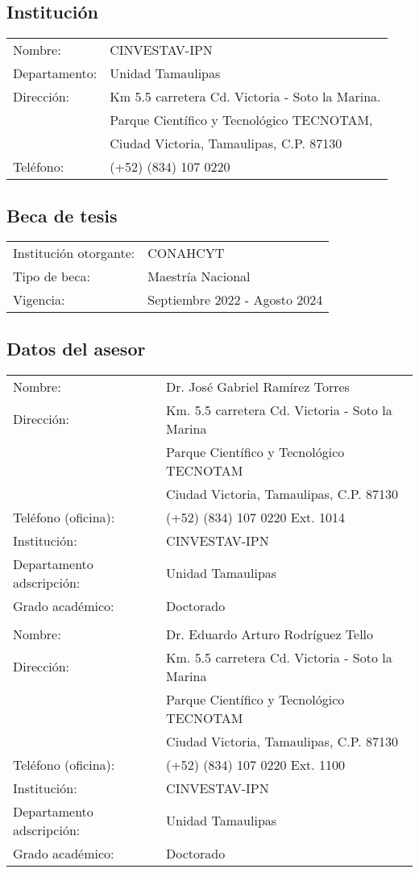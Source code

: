 \documentclass[11pt,epsf,times]{article}
\begin{document}
\subsection{Instituci\'{o}n}
\begin{tabular}{ll} 
Nombre:  &          CINVESTAV-IPN \\
Departamento:    &  Unidad Tamaulipas\\
Direcci\'{o}n:   &  Km 5.5 carretera Cd. Victoria - Soto la Marina.\\
                 &  Parque Cient\'{i}fico y Tecnol\'{o}gico TECNOTAM,\\
                 &  Ciudad Victoria, Tamaulipas, C.P. 87130\\
Tel\'{e}fono:    & (+52) (834) 107 0220\\
\end{tabular}
\subsection{Beca de tesis}
\begin{tabular}{ll} 
Instituci\'{o}n otorgante:  &  CONAHCYT  \\
Tipo de beca:      & Maestr\'ia Nacional\\
Vigencia:    &   Septiembre 2022 - Agosto 2024
\end{tabular}

\subsection{Datos del asesor}
\begin{tabular}{ll} 
Nombre:  &   Dr. José Gabriel Ramírez Torres \\
Direcci\'{o}n:   &   Km. 5.5 carretera Cd. Victoria - Soto la Marina\\
                 &  Parque Cient\'{i}fico y Tecnol\'{o}gico TECNOTAM\\
                 &  Ciudad Victoria, Tamaulipas, C.P. 87130\\
Tel\'{e}fono (oficina):    &  (+52) (834) 107 0220 Ext. 1014 \\ 
Instituci\'{o}n:    &  CINVESTAV-IPN \\ 
Departamento adscripci\'{o}n: &  Unidad Tamaulipas\\
Grado acad\'{e}mico: & Doctorado \\\\
Nombre:  &   Dr. Eduardo Arturo Rodríguez Tello \\
Direcci\'{o}n:   &   Km. 5.5 carretera Cd. Victoria - Soto la Marina\\
                 &  Parque Cient\'{i}fico y Tecnol\'{o}gico TECNOTAM\\
                 &  Ciudad Victoria, Tamaulipas, C.P. 87130\\
Tel\'{e}fono (oficina):    &  (+52) (834) 107 0220 Ext. 1100\\ 
Instituci\'{o}n:    &  CINVESTAV-IPN \\ 
Departamento adscripci\'{o}n: &  Unidad Tamaulipas\\
Grado acad\'{e}mico: & Doctorado 
\end{tabular} 
\end{document}
